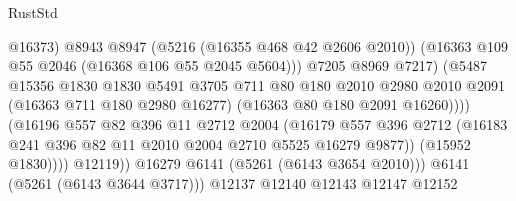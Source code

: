 \begin{lexlean}{RustStd}
\begin{coremodule}
                                            @16373)
                                          @8943
                                          @8947
                                          (@5216 (@16355 @468 @42 @2606 @2010))
                                          (@16363 @109 @55 @2046 (@16368 @106 @55 @2045 @5604)))
                                        @7205
                                        @8969
                                        @7217)
                                      (@5487
                                        @15356
                                        @1830
                                        @1830
                                        @5491
                                        @3705
                                        @711
                                        @80
                                        @180
                                        @2010
                                        @2980
                                        @2010
                                        @2091
                                        (@16363 @711 @180 @2980 @16277)
                                        (@16363 @80 @180 @2091 @16260))))
                                  (@16196
                                    @557
                                    @82
                                    @396
                                    @11
                                    @2712
                                    @2004
                                    (@16179
                                      @557
                                      @396
                                      @2712
                                      (@16183
                                        @241
                                        @396
                                        @82
                                        @11
                                        @2010
                                        @2004
                                        @2710
                                        @5525
                                        @16279
                                        @9877))
                                    (@15952 @1830))))
                              @12119))
                          @16279
                          @6141
                          (@5261 (@6143 @3654 @2010)))
                        @6141
                        (@5261 (@6143 @3644 @3717)))
                      @12137
                      @12140
                      @12143
                      @12147
                      @12152

\end{coremodule}
\end{lexlean}
